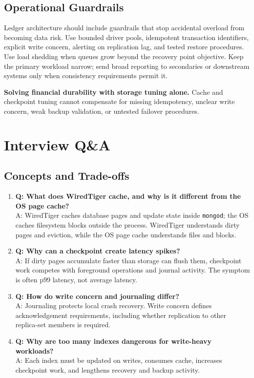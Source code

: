 \subsection{Operational Guardrails}
Ledger architecture should include guardrails that stop accidental overload from becoming data risk. Use bounded driver pools, idempotent transaction identifiers, explicit write concern, alerting on replication lag, and tested restore procedures. Use load shedding when queues grow beyond the recovery point objective. Keep the primary workload narrow; send broad reporting to secondaries or downstream systems only when consistency requirements permit it.

\begin{pitfall}
\textbf{Solving financial durability with storage tuning alone.} Cache and checkpoint tuning cannot compensate for missing idempotency, unclear write concern, weak backup validation, or untested failover procedures.
\end{pitfall}

\section{Interview Q\&A}
\subsection{Concepts and Trade-offs}
\begin{enumerate}
    \item \textbf{Q: What does WiredTiger cache, and why is it different from the OS page cache?}\\
    A: WiredTiger caches database pages and update state inside \texttt{mongod}; the OS caches filesystem blocks outside the process. WiredTiger understands dirty pages and eviction, while the OS page cache understands files and blocks.

    \item \textbf{Q: Why can a checkpoint create latency spikes?}\\
    A: If dirty pages accumulate faster than storage can flush them, checkpoint work competes with foreground operations and journal activity. The symptom is often p99 latency, not average latency.

    \item \textbf{Q: How do write concern and journaling differ?}\\
    A: Journaling protects local crash recovery. Write concern defines acknowledgement requirements, including whether replication to other replica-set members is required.

    \item \textbf{Q: Why are too many indexes dangerous for write-heavy workloads?}\\
    A: Each index must be updated on writes, consumes cache, increases checkpoint work, and lengthens recovery and backup activity.
\end{enumerate}

